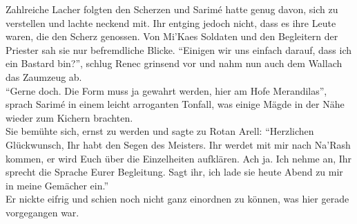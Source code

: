 Zahlreiche Lacher folgten den Scherzen und Sarimé hatte genug davon, sich zu verstellen und lachte 
neckend mit. Ihr entging jedoch nicht, dass es ihre Leute waren, die den Scherz genossen. Von 
Mi'Kaes Soldaten und den Begleitern der Priester sah sie nur befremdliche Blicke. ``Einigen wir uns 
einfach darauf, dass ich ein Bastard bin?'', schlug Renec grinsend vor und nahm nun auch dem Wallach 
das Zaumzeug ab.\\
``Gerne doch. Die Form muss ja gewahrt werden, hier am Hofe Merandilas'', sprach Sarimé in einem 
leicht arroganten Tonfall, was einige Mägde in der Nähe wieder zum Kichern brachten.\\
Sie bemühte sich, ernst zu werden und sagte zu Rotan Arell: ``Herzlichen Glückwunsch, Ihr 
habt den Segen des Meisters. Ihr werdet mit mir nach Na'Rash kommen, er wird Euch über die 
Einzelheiten aufklären. Ach ja. Ich nehme an, Ihr sprecht die Sprache Eurer Begleitung. Sagt ihr, 
ich lade sie heute Abend zu mir in meine Gemächer ein.''\\
Er nickte eifrig und schien noch nicht ganz einordnen zu können, was hier gerade vorgegangen war.\\

